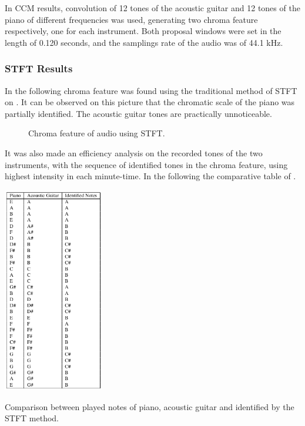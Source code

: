 \documentclass{article}
\begin{document}
In CCM results, convolution of 12 tones of the acoustic guitar and 12 tones of the piano of different frequencies was used, generating two chroma feature respectively, one for each instrument. Both proposal windows were set in the length of 0.120 seconds, and the samplings rate of the audio was of 44.1 kHz.

	\subsubsection{STFT Results}
	In the following chroma feature was found using the traditional method of STFT on . It can be observed on this picture that the chromatic scale of the piano was partially identified. The acoustic guitar tones are practically unnoticeable. 
	
	
	\begin{figure}[h!]
	 \centerline{}
	 \caption{Chroma feature of audio using STFT.}
	 \label{fig:2-ssft}
	\end{figure}	

	It was also made an efficiency analysis on the recorded tones of the two instruments, with the sequence of identified tones in the chroma feature, using highest intensity in each minute-time. In the following the comparative table of .

	\begin{table}[h!]
	 \begin{center}
	 	\centerline{
	 \includegraphics[width=\columnwidth,height=9cm]{figs/tabela_2.png}}
	 \end{center}
	 \caption{Comparison between played notes of piano, acoustic guitar and identified by the STFT method.}
	 \label{tab:table-2-sfft}
	\end{table}
\end{document}
